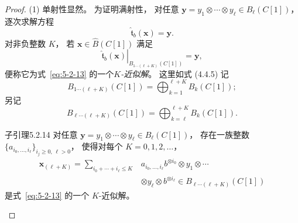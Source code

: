 \begin{proof}
\textup{(1)} 单射性显然。
为证明满射性，
对任意
$\mathbf y=y_1\otimes\cdots\otimes y_\ell
\in B_\ell(C[1])$，
逐次求解方程
\begin{equation}
\widehat{\mathfrak t}_b(\mathbf x)=\mathbf y.
\tag{5.2.13}\label{eq:5-2-13}
\end{equation}
对非负整数 $K$，
若 $\mathbf x\in\widehat B(C[1])$ 满足
\[
\left.\widehat{\mathfrak t}_b(\mathbf x)
\right|_{B_{1\cdots(\ell+K)}(C[1])}
=\mathbf y,
\]
便称它为式~\eqref{eq:5-2-13}
的一个\emph{$K$-近似解}。
这里如式 (4.4.5) 记
\[
B_{1\cdots(\ell+K)}(C[1])
=\bigoplus_{k=1}^{\ell+K}B_k(C[1]);
\]
另记
\[
B_{\ell\cdots(\ell+K)}(C[1])
=\bigoplus_{k=\ell}^{\ell+K}B_k(C[1]).
\]

\begin{statement}{子引理}{5.2.14}\label{sublem:5-2-14}
对任意
$\mathbf y=y_1\otimes\cdots\otimes y_\ell
\in B_\ell(C[1])$，
存在一族整数
$\{a_{i_0,\ldots,i_\ell}\}_{i_j\geq0,\,\ell>0}$，
使得对每个 $K=0,1,2,\ldots$，
\[
\begin{aligned}
\mathbf x_{(\ell+K)}
=\sum_{i_0+\cdots+i_\ell\leq K}
&a_{i_0,\ldots,i_\ell}
b^{\otimes i_0}\otimes y_1\otimes\cdots\\
&\otimes y_\ell\otimes b^{\otimes i_\ell}
\in B_{\ell\cdots(\ell+K)}(C[1])
\end{aligned}
\]
是式~\eqref{eq:5-2-13}
的一个 $K$-近似解。
\end{statement}


\end{proof}
